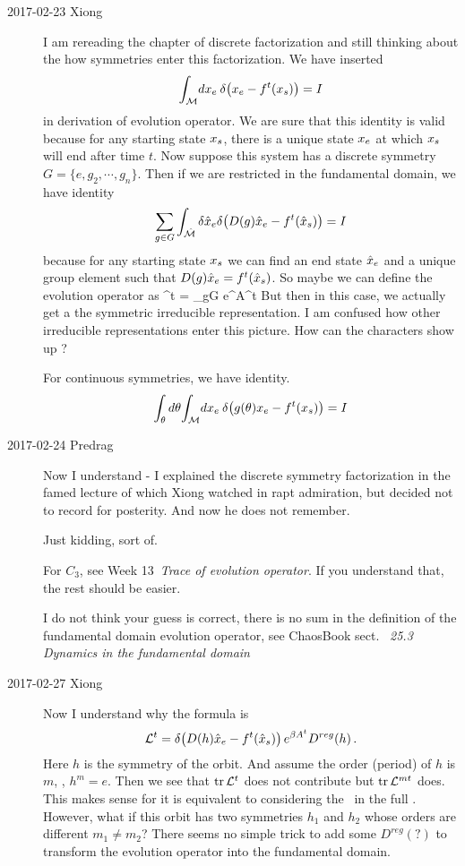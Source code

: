 \begin{description}
\item[2017-02-23 Xiong]
I am rereading the chapter of discrete factorization and still
thinking about the how symmetries enter this factorization.
We have inserted
\[
  {\int_{\mathcal{M}}{\!d x_e}\:}
  \delta\negthinspace\left( {x_e - f^t(x_s)} \right) = I
\]
in derivation of evolution operator.
We are sure that this identity is valid because for any
starting state
$x_s$, there is a unique state $x_e$ at which $x_s$ will end
after time $t$.
Now suppose this system has a discrete symmetry $G=\{e, g_2,\cdots, g_n\}$.
Then if we are restricted in the fundamental domain, we have identity
\[
  \sum_{g\in G} \int_{\hat{\mathcal{M}}}{\delta \hat{x}_e}
  \delta\negthinspace\left( {D(g)\hat{x}_e - f^t(\hat{x}_s)} \right) = I
\]
because for any starting state $x_s$ we can find an end state
$\hat{x}_e$ and a unique group element such that
$D(g)\hat{x}_e = f^t(\hat{x}_s)$. So maybe we can define the evolution operator
as
\beq
  \Lop^t = \sum_{g\in G}
   e^{\beta A^t}
But then in this case, we actually get a the symmetric irreducible representation.
I am confused how other irreducible representations enter this picture. How can
the characters show up ?

For continuous symmetries, we have identity.
\[
  \int_{\theta}d\theta\intM{\ssp_e}
  \prpgtr{g(\theta)\ssp_e - f^t(\ssp_s)} = I
\]

\item[2017-02-24 Predrag]
Now I understand - I explained the discrete symmetry factorization
in the famed lecture of
which Xiong watched in rapt admiration, but decided not to record for
posterity. And now he does not remember.

Just kidding, sort of.

For $C_3$, see  {Week
13}~{\em Trace of evolution operator}. If you understand that, the rest
should be easier.

I do not think your guess  is correct, there is no sum
in the definition of the fundamental domain evolution operator, see ChaosBook
sect.~ {\em 25.3 Dynamics in the
fundamental domain}

\item[2017-02-27 Xiong]
Now I understand why the formula is
\[
  \mathcal{L}^t =
  \delta\negthinspace\left( {D(h)\hat{x}_e - f^t(\hat{x}_s)} \right) e^{\beta A^t} D^{reg}(h)
  \,.
\]
Here $h$ is the symmetry of the orbit. And assume the order (period)
of $h$ is $m$, \ie, $h^m = e$. Then we see that $\mathrm{tr}\, \mathcal{L}^t$ does
not contribute but $\mathrm{tr}\, \mathcal{L}^{mt}$ does. This makes sense for it
is equivalent to considering the \po\ in the full \statesp.
However, what if this orbit has two symmetries $h_1$ and $h_2$ whose
orders are different $m_1 \neq m_2$? There seems no simple trick to
add some $D^{reg}(?)$ to transform the evolution operator into
the fundamental domain.


\end{description}
